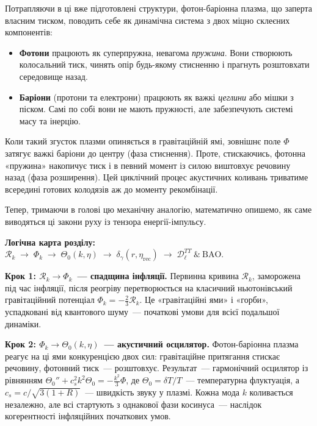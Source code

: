 Потрапляючи в ці вже підготовлені структури, фотон-баріонна плазма, що заперта
власним тиском, поводить себе як динамічна система з двох міцно склеєних компонентів:
\begin{itemize}
    \item \textbf{Фотони} працюють як суперпружна, невагома \emph{пружина}.
    Вони створюють колосальний тиск, чинять опір будь-якому стисненню
    і прагнуть розштовхати середовище назад.
    \item \textbf{Баріони} (протони та електрони) працюють як важкі
    \emph{цеглини} або мішки з піском. Самі по собі вони не мають
    пружності, але забезпечують системі масу та інерцію.
\end{itemize}
Коли такий згусток плазми опиняється в гравітаційній ямі, зовнішнє поле $\Phi$
затягує важкі баріони до центру (фаза стиснення). Проте, стискаючись, фотонна
«пружина» накопичує тиск і в певний момент із силою виштовхує речовину назад
(фаза розширення). Цей циклічний процес акустичних коливань триватиме всередині
готових колодязів аж до моменту рекомбінації.


Тепер, тримаючи в голові цю механічну аналогію, математично опишемо, як саме
виводяться ці закони руху із тензора енергії-імпульсу.

\medskip
\noindent\textbf{Логічна карта розділу:}
$\mathcal{R}_k \;\longrightarrow\; \Phi_k \;\longrightarrow\;
\Theta_0(k,\eta) \;\longrightarrow\; \delta_\gamma(r,\eta_\mathrm{rec})
\;\longrightarrow\; \mathcal{D}_\ell^{TT}\ \&\ \mathrm{BAO}$.

\medskip
\noindent\textbf{Крок 1: $\mathcal{R}_k \to \Phi_k$~--- спадщина інфляції.}
Первинна кривина $\mathcal{R}_k$, заморожена під час інфляції,
після реогріву перетворюється на класичний ньютонівський
гравітаційний потенціал $\Phi_k = -\frac{2}{3}\mathcal{R}_k$.
Це «гравітаційні ями» і «горби», успадковані від квантового
шуму~--- початкові умови для всієї подальшої динаміки.

\medskip
\noindent\textbf{Крок 2: $\Phi_k \to \Theta_0(k,\eta)$~--- акустичний осцилятор.}
Фотон-баріонна плазма реагує на ці ями конкуренцією двох сил:
гравітаційне притягання стискає речовину, фотонний тиск~---
розштовхує. Результат~--- гармонічний осцилятор із рівнянням
$\Theta_0'' + c_s^2 k^2\Theta_0 = -\frac{k^2}{3}\Phi$,
де $\Theta_0 = \delta T/T$~--- температурна флуктуація, а
$c_s = c/\sqrt{3(1+R)}$~--- швидкість звуку у плазмі.
Кожна мода $k$ коливається незалежно, але всі стартують
з однакової фази косинуса~--- наслідок когерентності
інфляційних початкових умов.


